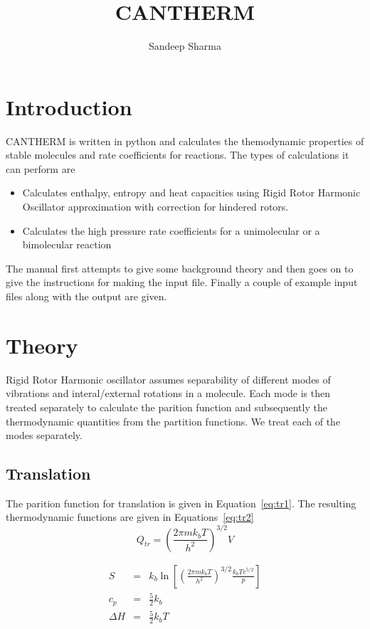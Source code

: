 \documentclass[a4paper,12pt]{article}
\title{CANTHERM}
\author{Sandeep Sharma}
\begin{document}
 \maketitle
\tableofcontents
\section{Introduction}
CANTHERM is written in python and calculates the themodynamic properties of stable molecules and rate coefficients for reactions. The types of calculations it can perform are
\begin{itemize}
 \item Calculates enthalpy, entropy and heat capacities using Rigid Rotor Harmonic Oscillator approximation with correction for hindered rotors.
\item Calculates the high pressure rate coefficients for a unimolecular or a bimolecular reaction
\end{itemize}
The manual first attempts to give some background theory and then goes on to give the instructions for making the input file. Finally a couple of example input files along with the output are given.

\section{Theory}
Rigid Rotor Harmonic oscillator assumes separability of different modes of vibrations and interal/external rotations in a molecule. Each mode is then treated separately to calculate the parition function and subsequently the thermodynamic quantities from the partition functions. We treat each of the modes separately.
\subsection{Translation}
The parition function for translation is given in Equation~\ref{eq:tr1}. The resulting thermodynamic functions are given in Equations~\ref{eq:tr2}
\begin{equation}
 Q_{tr} = \left(\frac{2\pi m k_bT}{h^2}\right)^{3/2}V
\label{eq:tr1}
\end{equation}

\begin{eqnarray}
 S%
&=&k_b \ln\left[\left(\frac{2\pi m k_bT}{h^2}\right)^{3/2} \frac{k_bTe^{5/2}}{p}\right]\nonumber\\
c_p&=& \frac{5}{2}k_b \nonumber \\
\Delta H&=& \frac{5}{2}k_bT
\label{eq:tr2}
\end{eqnarray}
\end{document}
